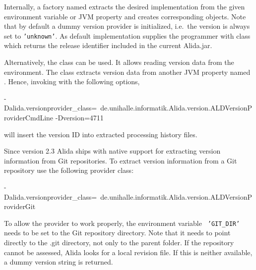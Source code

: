 Internally, a factory named  extracts the desired implementation
from the given environment variable or JVM property and creates corresponding
objects. Note that by default a dummy version provider is initialized, i.e.~the
version is always set to {\tt 'unknown'}. As default implementation
\alida supplies the programmer with class  which 
returns the \alida release identifier included in the current Alida.jar. 

Alternatively, the class  can be used. 
It allows reading version data from the environment. The class extracts version data from another JVM property 
named . Hence, invoking \alida with the following options,\\[0.1cm]
\begin{code}
  -Dalida.versionprovider_class=\
        de.unihalle.informatik.Alida.version.ALDVersionProviderCmdLine -Dversion=4711
\end{code}
will insert the version ID  into extracted processing history files.

Since version 2.3 Alida ships with native support for extracting version information from Git repositories. 
To extract version information from a Git repository use the following provider class:\\[0.1cm]
\begin{code}
  -Dalida.versionprovider_class=\
        de.unihalle.informatik.Alida.version.ALDVersionProviderGit
\end{code}

To allow the provider to work properly, the environment variable {\tt
'GIT\_DIR'} needs to be set to the Git repository directory. Note that it needs to point directly to the .git directory, not only to the parent folder.
If the repository cannot be assessed, Alida looks for a local revision file. If this is neither available, 
a dummy version string is returned.
